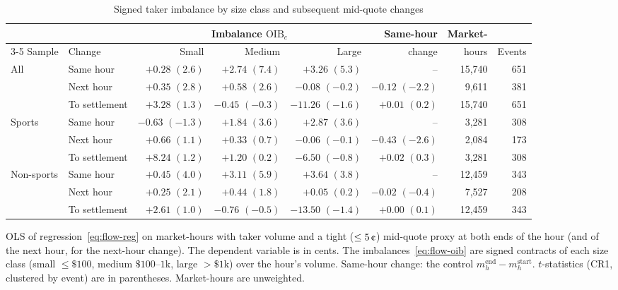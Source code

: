 \begin{table}[htbp]
\centering
\begin{threeparttable}
\caption{Signed taker imbalance by size class and subsequent mid-quote changes}\label{tab:flow-oib}
\footnotesize
\setlength{\tabcolsep}{4pt}
\begin{tabular}{@{}llrrrrrr@{}}
\toprule
 & & \multicolumn{3}{c}{Imbalance $\mathrm{OIB}_c$} & Same-hour & Market- & \\
\cmidrule(lr){3-5}
Sample & Change & Small & Medium & Large & change & hours & Events \\
\midrule
All & Same hour & $+0.28$ $(2.6)$ & $+2.74$ $(7.4)$ & $+3.26$ $(5.3)$ & -- & 15,740 & 651 \\
 & Next hour & $+0.35$ $(2.8)$ & $+0.58$ $(2.6)$ & $-0.08$ $(-0.2)$ & $-0.12$ $(-2.2)$ & 9,611 & 381 \\
 & To settlement & $+3.28$ $(1.3)$ & $-0.45$ $(-0.3)$ & $-11.26$ $(-1.6)$ & $+0.01$ $(0.2)$ & 15,740 & 651 \\
Sports & Same hour & $-0.63$ $(-1.3)$ & $+1.84$ $(3.6)$ & $+2.87$ $(3.6)$ & -- & 3,281 & 308 \\
 & Next hour & $+0.66$ $(1.1)$ & $+0.33$ $(0.7)$ & $-0.06$ $(-0.1)$ & $-0.43$ $(-2.6)$ & 2,084 & 173 \\
 & To settlement & $+8.24$ $(1.2)$ & $+1.20$ $(0.2)$ & $-6.50$ $(-0.8)$ & $+0.02$ $(0.3)$ & 3,281 & 308 \\
Non-sports & Same hour & $+0.45$ $(4.0)$ & $+3.11$ $(5.9)$ & $+3.64$ $(3.8)$ & -- & 12,459 & 343 \\
 & Next hour & $+0.25$ $(2.1)$ & $+0.44$ $(1.8)$ & $+0.05$ $(0.2)$ & $-0.02$ $(-0.4)$ & 7,527 & 208 \\
 & To settlement & $+2.61$ $(1.0)$ & $-0.76$ $(-0.5)$ & $-13.50$ $(-1.4)$ & $+0.00$ $(0.1)$ & 12,459 & 343 \\
\bottomrule
\end{tabular}
\begin{tablenotes}\footnotesize
\item OLS of regression~\eqref{eq:flow-reg} on market-hours with taker volume and a tight
($\le5\cents$) mid-quote proxy at both ends of the hour (and of the next hour, for the next-hour
change). The dependent
variable is in cents. The imbalances~\eqref{eq:flow-oib} are signed contracts of each size
class (small $\le\$100$, medium $\$100$--$1$k, large $>\$1$k) over the hour's volume. Same-hour
change: the control $m^{\mathrm{end}}_h-m^{\mathrm{start}}_h$. $t$-statistics (CR1, clustered
by event) are in parentheses. Market-hours are unweighted.
\end{tablenotes}
\end{threeparttable}
\end{table}

